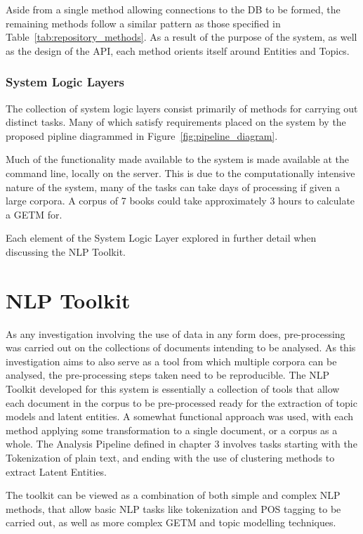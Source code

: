 \documentclass[10pt]{report}
\begin{document}
Aside from a single method allowing connections to the DB to be formed, the remaining methods follow a similar pattern as those specified in Table~\ref{tab:repository_methods}. As a result of the purpose of the system, as well as the design of the API, each method orients itself around Entities and Topics.

\subsubsection{System Logic Layers}
The collection of system logic layers consist primarily of methods for carrying out distinct tasks. Many of which satisfy requirements placed on the system by the proposed pipline diagrammed in Figure~\ref{fig:pipeline_diagram}.

Much of the functionality made available to the system is made available at the command line, locally on the server. This is due to the computationally intensive nature of the system, many of the tasks can take days of processing if given a large corpora. A corpus of 7 books could take approximately 3 hours to calculate a GETM for.

Each element of the System Logic Layer explored in further detail when discussing the NLP Toolkit.

\section{NLP Toolkit}
As any investigation involving the use of data in any form does, pre-processing was carried out on the collections of documents intending to be analysed. As this investigation aims to also serve as a tool from which multiple corpora can be analysed, the pre-processing steps taken need to be reproducible. The NLP Toolkit developed for this system is essentially a collection of tools that allow each document in the corpus to be pre-processed ready for the extraction of topic models and latent entities. A somewhat functional approach was used, with each method applying some transformation to a single document, or a corpus as a whole. The Analysis Pipeline defined in chapter 3 involves tasks starting with the Tokenization of plain text, and ending with the use of clustering methods to extract Latent Entities.

The toolkit can be viewed as a combination of both simple and complex NLP methods, that allow basic NLP tasks like tokenization and POS tagging to be carried out, as well as more complex GETM and topic modelling techniques.
\end{document}
